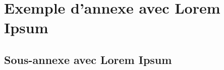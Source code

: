 





\section{Exemple d'annexe avec Lorem Ipsum}
\lipsum[1-3]

\subsection{Sous-annexe avec Lorem Ipsum}
\lipsum[4-6]


%
%
%
%
%
%
%
%
%
%
